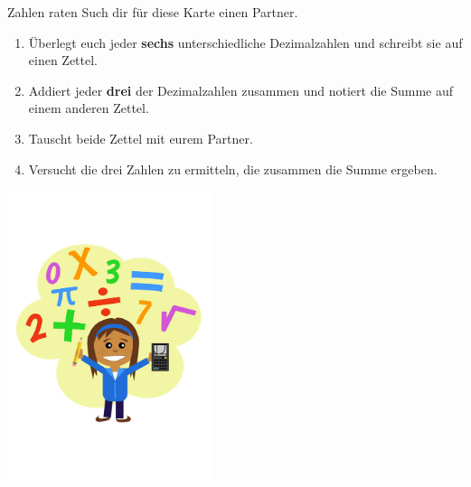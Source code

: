\documentclass[12pt,a5paper,landscape]{scrartcl}
\begin{document}
	\begin{karte3}[\symPartner]{Zahlen raten}
		Such dir für diese Karte einen Partner.
		
		\begin{multicols}{2}
			\begin{enumerate}
				\item Überlegt euch jeder \textbf{sechs} unterschiedliche Dezimalzahlen und schreibt sie auf einen Zettel.	
				\item Addiert jeder \textbf{drei} der Dezimalzahlen zusammen und notiert die Summe auf einem anderen Zettel.
				\item Tauscht beide Zettel mit eurem Partner.
				\item Versucht die drei Zahlen zu ermitteln, die zusammen die Summe ergeben.
			\end{enumerate}
			
			\columnbreak
			
			\begin{center}
				\includegraphics[width=6cm]{6.2-LT-Abb_Rechnen}
			\end{center}
		\end{multicols}
		
	\end{karte3}
	
	\leereKarte
	
\end{document}
